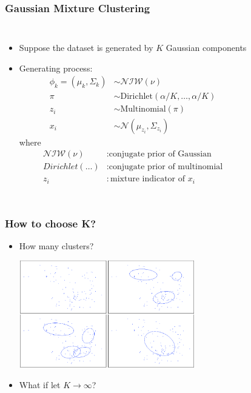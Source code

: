\documentclass{beamer}
\begin{document}
\begin{frame}
\frametitle{Gaussian Mixture Clustering}

\begin{columns}
\begin{itemize}

	\item Suppose the dataset is generated by $K$ Gaussian components 
	\item Generating process:
\begin{align*}
\phi_k = (\mu_k, \Sigma_k) & \sim \mathcal{NIW}(\nu) \\
\pi & \sim \text{Dirichlet}(\alpha/K, \ldots, \alpha/K) \\
z_i & \sim \text{Multinomial}(\pi) \\
x_i & \sim \mathcal{N}(\mu_{z_i}, \Sigma_{z_i})
\end{align*}
where 
\begin{align*}
\mathcal{NIW}(\nu) & : \text{conjugate prior of Gaussian} \\
Dirichlet(\ldots) & : \text{conjugate prior of multinomial} \\
z_i & : \text{mixture indicator of } x_i
\end{align*}
\end{itemize}
\centering
\end{columns}
\end{frame}

\begin{frame}
	\frametitle{How to choose K?}
	\begin{itemize}
		\item How many clusters?
		\begin{center}
			\includegraphics[width=0.6\textwidth]{img/unknown.png}
		\end{center}		
		\item What if let $K \rightarrow \infty$?
	\end{itemize}
\end{frame}
\end{document}
